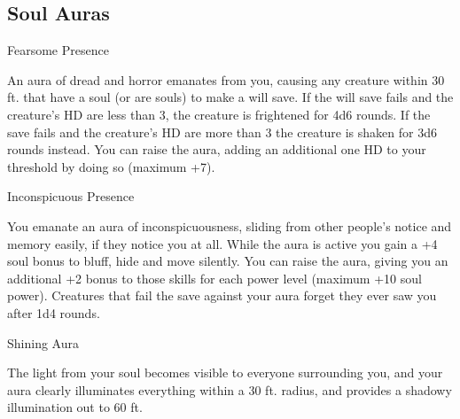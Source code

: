 \subsection{Soul Auras}

\begin{soulpower}{Fearsome Presence}
  \components{-}

  An aura of dread and horror emanates from you, causing any creature within
  30 ft. that have a soul (or are souls) to make a will save. If the will save
  fails and the creature's HD are less than 3, the creature is frightened for
  4d6 rounds. If the save fails and the creature's HD are more than 3 the
  creature is shaken for 3d6 rounds instead. You can raise the aura, adding an
  additional one HD to your threshold by doing so (maximum +7).
\end{soulpower}

\begin{soulpower}{Inconspicuous Presence}

  \components{-}
  \rangepersonal

  You emanate an aura of inconspicuousness, sliding from other people's notice
  and memory easily, if they notice you at all. While the aura is active you
  gain a +4 soul bonus to bluff, hide and move silently. You can raise the
  aura, giving you an additional +2 bonus to those skills for each power level
  (maximum +10 soul power). Creatures that fail the save against your aura
  forget they ever saw you after 1d4 rounds.
\end{soulpower}

\begin{soulpower}{Shining Aura}
  \components{-}
  \rangepersonal

  The light from your soul becomes visible to everyone surrounding you, and
  your aura clearly illuminates everything within a 30 ft. radius, and
  provides a shadowy illumination out to 60 ft.
\end{soulpower}
